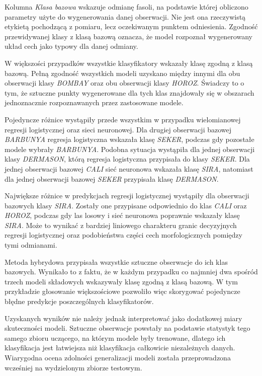 \documentclass{report}
\begin{document}


Kolumna \textit{Klasa bazowa} wskazuje odmianę fasoli, na podstawie której obliczono parametry użyte do wygenerowania danej obserwacji. Nie jest ona rzeczywistą etykietą pochodzącą z pomiaru, lecz oczekiwanym punktem odniesienia. Zgodność przewidywanej klasy z klasą bazową oznacza, że model rozpoznał wygenerowany układ cech jako typowy dla danej odmiany.

W większości przypadków wszystkie klasyfikatory wskazały klasę zgodną z klasą bazową. Pełną zgodność wszystkich modeli uzyskano między innymi dla obu obserwacji klasy \textit{BOMBAY} oraz obu obserwacji klasy \textit{HOROZ}. Świadczy to o tym, że sztuczne punkty wygenerowane dla tych klas znajdowały się w obszarach jednoznacznie rozpoznawanych przez zastosowane modele.

Pojedyncze różnice wystąpiły przede wszystkim w przypadku wielomianowej regresji logistycznej oraz sieci neuronowej. Dla drugiej obserwacji bazowej \textit{BARBUNYA} regresja logistyczna wskazała klasę \textit{SEKER}, podczas gdy pozostałe modele wybrały \textit{BARBUNYA}. Podobna sytuacja wystąpiła dla jednej obserwacji klasy \textit{DERMASON}, którą regresja logistyczna przypisała do klasy \textit{SEKER}. Dla jednej obserwacji bazowej \textit{CALI} sieć neuronowa wskazała klasę \textit{SIRA}, natomiast dla jednej obserwacji bazowej \textit{SEKER} przypisała klasę \textit{DERMASON}.

Największe różnice w predykcjach regresji logistycznej wystąpiły dla obserwacji bazowych klasy \textit{SIRA}. Zostały one przypisane odpowiednio do klas \textit{CALI} oraz \textit{HOROZ}, podczas gdy las losowy i sieć neuronowa poprawnie wskazały klasę \textit{SIRA}. Może to wynikać z bardziej liniowego charakteru granic decyzyjnych regresji logistycznej oraz podobieństwa części cech morfologicznych pomiędzy tymi odmianami.

Metoda hybrydowa przypisała wszystkie sztuczne obserwacje do ich klas bazowych. Wynikało to z faktu, że w każdym przypadku co najmniej dwa spośród trzech modeli składowych wskazywały klasę zgodną z klasą bazową. W tym przykładzie głosowanie większościowe pozwoliło więc skorygować pojedyncze błędne predykcje poszczególnych klasyfikatorów.

Uzyskanych wyników nie należy jednak interpretować jako dodatkowej miary skuteczności modeli. Sztuczne obserwacje powstały na podstawie statystyk tego samego zbioru uczącego, na którym modele były trenowane, dlatego ich klasyfikacja jest łatwiejsza niż klasyfikacja całkowicie niezależnych danych. Wiarygodna ocena zdolności generalizacji modeli została przeprowadzona wcześniej na wydzielonym zbiorze testowym.
\end{document}
